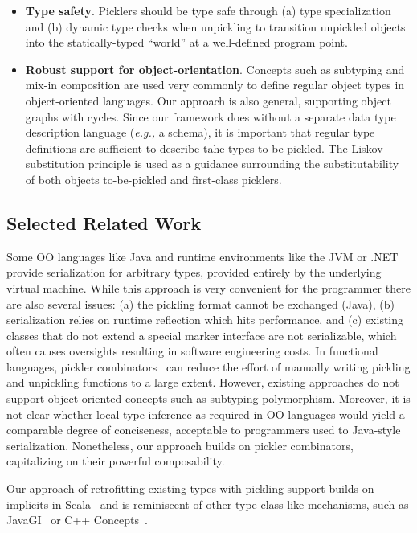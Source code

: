 \documentclass[preprint,10pt]{sigplanconf}
\theoremstyle{definition}
\theoremstyle{definition}
\begin{document}
\begin{itemize}
\item {\bf Type safety}. Picklers should be type safe through (a) type
specialization and (b) dynamic type checks when unpickling to transition
unpickled objects into the statically-typed ``world'' at a well-defined program
point.

\item {\bf Robust support for object-orientation}. Concepts such as subtyping
and mix-in composition are used very commonly to define
regular object types in object-oriented languages. Our approach is also general,
supporting object graphs with cycles. Since our framework does
without a separate data type description language ({\em e.g.,} a schema), it
is important that regular type definitions are sufficient to describe tahe
types to-be-pickled. The Liskov substitution principle is used as a guidance
surrounding the substitutability of both objects to-be-pickled and first-class
picklers.
\end{itemize}


\subsection{Selected Related Work}

Some OO languages like Java and runtime environments like the JVM or
.NET provide serialization for arbitrary types, provided entirely by
the underlying virtual machine. While this approach is very convenient
for the programmer there are also several issues: (a) the pickling
format cannot be exchanged (Java), (b) serialization relies on runtime
reflection which hits performance, and (c) existing classes that do
not extend a special marker interface are not serializable, which
often causes oversights resulting in software engineering costs. In
functional languages, pickler
combinators~\cite{Kennedy2004,Elsman2005} can reduce the effort of
manually writing pickling and unpickling functions to a large
extent. However, existing approaches do not support object-oriented
concepts such as subtyping polymorphism. Moreover, it is not clear
whether local type inference as required in OO languages would yield a
comparable degree of conciseness, acceptable to programmers used to
Java-style serialization.  Nonetheless, our approach builds on pickler
combinators, capitalizing on their powerful composability.

Our approach of retrofitting existing types with pickling support
builds on implicits in Scala~\cite{Oliveira2010} and is reminiscent of
other type-class-like mechanisms, such as JavaGI~\cite{WehrT11} or C++
Concepts~\cite{ReisS06}.
\end{document}
